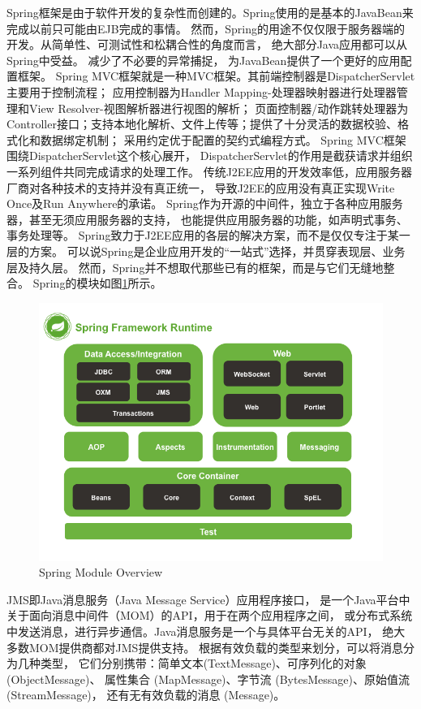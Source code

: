 \documentclass{book}
\begin{document}
Spring框架是由于软件开发的复杂性而创建的。Spring使用的是基本的JavaBean来完成以前只可能由EJB完成的事情。
然而，Spring的用途不仅仅限于服务器端的开发。从简单性、可测试性和松耦合性的角度而言，
绝大部分Java应用都可以从Spring中受益。
减少了不必要的异常捕捉，
为JavaBean提供了一个更好的应用配置框架。
Spring MVC框架就是一种MVC框架。其前端控制器是DispatcherServlet主要用于控制流程；
应用控制器为Handler Mapping-处理器映射器进行处理器管理和View Resolver-视图解析器进行视图的解析；
页面控制器/动作跳转处理器为Controller接口；支持本地化解析、文件上传等；提供了十分灵活的数据校验、格式化和数据绑定机制；
采用约定优于配置的契约式编程方式。 
Spring MVC框架围绕DispatcherServlet这个核心展开，
DispatcherServlet的作用是截获请求并组织一系列组件共同完成请求的处理工作。
传统J2EE应用的开发效率低，应用服务器厂商对各种技术的支持并没有真正统一，
导致J2EE的应用没有真正实现Write Once及Run Anywhere的承诺。
Spring作为开源的中间件，独立于各种应用服务器，甚至无须应用服务器的支持，
也能提供应用服务器的功能，如声明式事务、事务处理等。
Spring致力于J2EE应用的各层的解决方案，而不是仅仅专注于某一层的方案。
可以说Spring是企业应用开发的“一站式”选择，并贯穿表现层、业务层及持久层。
然而，Spring并不想取代那些已有的框架，而是与它们无缝地整合。
Spring的模块如图\ref{code:spring-overview-current}所示。

\begin{figure}[htbp]
	\centering
	\includegraphics[scale=0.5]{spring-overview-current.png}
	\caption{Spring Module Overview}
	\label{code:spring-overview-current}
\end{figure}

JMS即Java消息服务（Java Message Service）应用程序接口，
是一个Java平台中关于面向消息中间件（MOM）的API，用于在两个应用程序之间，
或分布式系统中发送消息，进行异步通信。Java消息服务是一个与具体平台无关的API，
绝大多数MOM提供商都对JMS提供支持。
根据有效负载的类型来划分，可以将消息分为几种类型，
它们分别携带：简单文本(TextMessage)、可序列化的对象 (ObjectMessage)、
属性集合 (MapMessage)、字节流 (BytesMessage)、原始值流 (StreamMessage)，
还有无有效负载的消息 (Message)。
\end{document}
